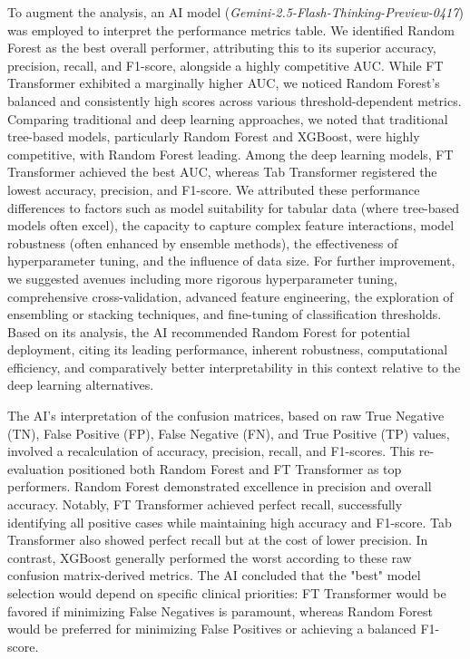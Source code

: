 To augment the analysis, an AI model (\textit{Gemini-2.5-Flash-Thinking-Preview-0417}) \parencite{Doshi_2025} was employed to interpret the performance metrics table. We identified Random Forest as the best overall performer, attributing this to its superior accuracy, precision, recall, and F1-score, alongside a highly competitive AUC. While FT Transformer exhibited a marginally higher AUC, we noticed Random Forest's balanced and consistently high scores across various threshold-dependent metrics. Comparing traditional and deep learning approaches, we noted that traditional tree-based models, particularly Random Forest and XGBoost, were highly competitive, with Random Forest leading. Among the deep learning models, FT Transformer achieved the best AUC, whereas Tab Transformer registered the lowest accuracy, precision, and F1-score. We attributed these performance differences to factors such as model suitability for tabular data (where tree-based models often excel), the capacity to capture complex feature interactions, model robustness (often enhanced by ensemble methods), the effectiveness of hyperparameter tuning, and the influence of data size. For further improvement, we suggested avenues including more rigorous hyperparameter tuning, comprehensive cross-validation, advanced feature engineering, the exploration of ensembling or stacking techniques, and fine-tuning of classification thresholds. Based on its analysis, the AI recommended Random Forest for potential deployment, citing its leading performance, inherent robustness, computational efficiency, and comparatively better interpretability in this context relative to the deep learning alternatives.

The AI's interpretation of the confusion matrices, based on raw True Negative (TN), False Positive (FP), False Negative (FN), and True Positive (TP) values, involved a recalculation of accuracy, precision, recall, and F1-scores. This re-evaluation positioned both Random Forest and FT Transformer as top performers. Random Forest demonstrated excellence in precision and overall accuracy. Notably, FT Transformer achieved perfect recall, successfully identifying all positive cases while maintaining high accuracy and F1-score. Tab Transformer also showed perfect recall but at the cost of lower precision. In contrast, XGBoost generally performed the worst according to these raw confusion matrix-derived metrics. The AI concluded that the "best" model selection would depend on specific clinical priorities: FT Transformer would be favored if minimizing False Negatives is paramount, whereas Random Forest would be preferred for minimizing False Positives or achieving a balanced F1-score.


